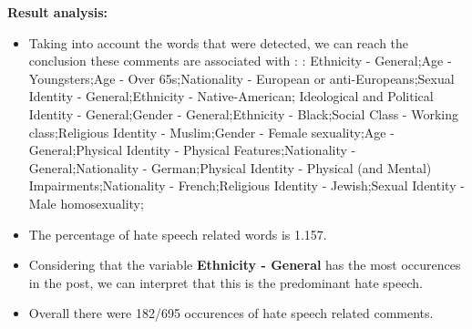 \documentclass[11pt]{article}
\begin{document}
\textbf{\Large Result analysis:}

\begin{itemize}\item Taking into account the words that were detected, we can reach the conclusion these comments are associated with : : Ethnicity - General;Age - Youngsters;Age - Over 65s;Nationality - European or anti-Europeans;Sexual Identity - General;Ethnicity - Native-American; Ideological and Political Identity - General;Gender - General;Ethnicity - Black;Social Class - Working class;Religious Identity - Muslim;Gender - Female sexuality;Age - General;Physical Identity - Physical Features;Nationality - General;Nationality - German;Physical Identity - Physical (and Mental) Impairments;Nationality - French;Religious Identity - Jewish;Sexual Identity - Male homosexuality;%

\item The percentage of hate speech related words is 1.157.

\item Considering that the variable \textbf{Ethnicity - General} has the most occurences in the post, we can interpret that this is the predominant hate speech.

\item Overall there were 182/695 occurences of hate speech related comments.\end{itemize}
\end{document}
